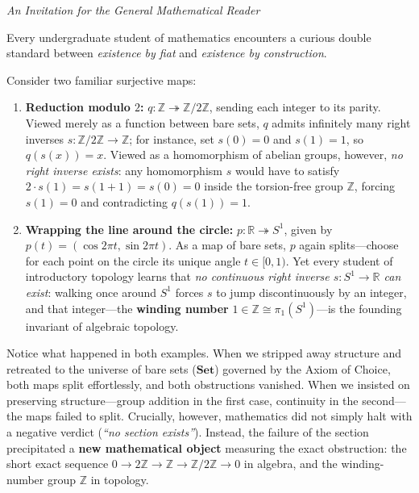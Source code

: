 \documentclass[10pt,twoside,openright]{book}
\theoremstyle{crmplain}
\theoremstyle{crmdef}
\theoremstyle{crmremark}
\begin{document}
\noindent\emph{An Invitation for the General Mathematical Reader}
\medskip

Every undergraduate student of mathematics encounters a curious double standard between \emph{existence by fiat} and \emph{existence by construction}.

Consider two familiar surjective maps:

\begin{enumerate}
  \item \textbf{Reduction modulo $2$:} $q : \mathbb{Z} \twoheadrightarrow \mathbb{Z}/2\mathbb{Z}$, sending each integer to its parity. Viewed merely as a function between bare sets, $q$ admits infinitely many right inverses $s : \mathbb{Z}/2\mathbb{Z} \to \mathbb{Z}$; for instance, set $s(0) = 0$ and $s(1) = 1$, so $q(s(x)) = x$. Viewed as a homomorphism of abelian groups, however, \emph{no right inverse exists}: any homomorphism $s$ would have to satisfy $2 \cdot s(1) = s(1 + 1) = s(0) = 0$ inside the torsion-free group $\mathbb{Z}$, forcing $s(1) = 0$ and contradicting $q(s(1)) = 1$.
  \item \textbf{Wrapping the line around the circle:} $p : \mathbb{R} \twoheadrightarrow S^1$, given by $p(t) = (\cos 2\pi t, \sin 2\pi t)$. As a map of bare sets, $p$ again splits---choose for each point on the circle its unique angle $t \in [0, 1)$. Yet every student of introductory topology learns that \emph{no continuous right inverse $s : S^1 \to \mathbb{R}$ can exist}: walking once around $S^1$ forces $s$ to jump discontinuously by an integer, and that integer---the \textbf{winding number} $1 \in \mathbb{Z} \cong \pi_1(S^1)$---is the founding invariant of algebraic topology.
\end{enumerate}

Notice what happened in both examples. When we stripped away structure and retreated to the universe of bare sets ($\mathbf{Set}$) governed by the Axiom of Choice, both maps split effortlessly, and both obstructions vanished. When we insisted on preserving structure---group addition in the first case, continuity in the second---the maps failed to split. Crucially, however, mathematics did not simply halt with a negative verdict (\emph{``no section exists''}). Instead, the failure of the section precipitated a \textbf{new mathematical object} measuring the exact obstruction: the short exact sequence $0 \to 2\mathbb{Z} \to \mathbb{Z} \to \mathbb{Z}/2\mathbb{Z} \to 0$ in algebra, and the winding-number group $\mathbb{Z}$ in topology.
\end{document}
